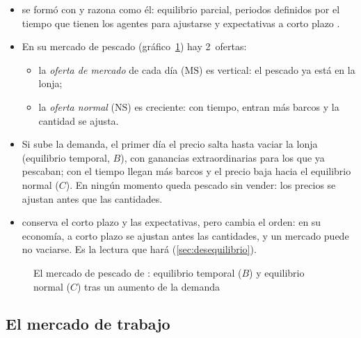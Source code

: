 \documentclass[11pt]{article}
\begin{document}
\begin{itemize}
\item {} se formó con  y razona como él: equilibrio parcial, periodos definidos por el tiempo que tienen los agentes para ajustarse y expectativas a corto plazo\nocite{Marshall1890Principles} .
\item En su mercado de pescado (gráfico~\ref{fig:marshall-periodos}) hay 2~ofertas:
  \begin{itemize}
  \item la \emph{oferta de mercado} de cada día ($\mathrm{MS}$) es vertical: el pescado ya está en la lonja;
  \item la \emph{oferta normal} ($\mathrm{NS}$) es creciente: con tiempo, entran más barcos y la cantidad se ajusta.
  \end{itemize}
\item Si sube la demanda, el primer día el precio salta hasta vaciar la lonja (equilibrio temporal, $B$), con ganancias extraordinarias para los que ya pescaban; con el tiempo llegan más barcos y el precio baja hacia el equilibrio normal ($C$). En ningún momento queda pescado sin vender: los precios se ajustan antes que las cantidades.
\item {} conserva el corto plazo y las expectativas, pero cambia el orden: en su economía, a corto plazo se ajustan antes las cantidades, y un mercado puede no vaciarse. Es la lectura que hará  (\ref{sec:desequilibrio}).
\end{itemize}

\begin{figure}[H]
\centering
\caption{El mercado de pescado de : equilibrio temporal ($B$) y equilibrio normal ($C$) tras un aumento de la demanda}\label{fig:marshall-periodos}
\end{figure}

\subsection{El mercado de trabajo}\label{anexo:trabajo}
\end{document}

